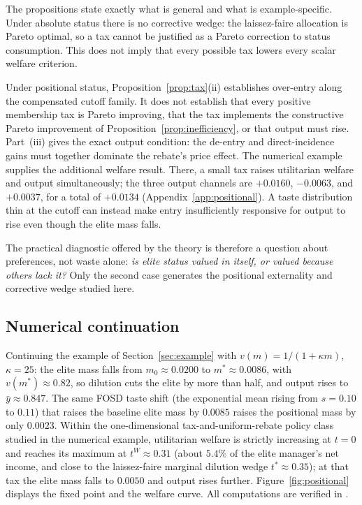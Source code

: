 \documentclass[12pt,letterpaper]{article}
\theoremstyle{definition}
\begin{document}
The propositions state exactly what is general and what is example-specific.
Under absolute status there is no corrective wedge: the laissez-faire allocation is Pareto optimal, so a tax cannot be justified as a Pareto correction to status consumption.
This does not imply that every possible tax lowers every scalar welfare criterion.

Under positional status, Proposition~\ref{prop:tax}(ii) establishes over-entry along the compensated cutoff family.
It does not establish that every positive membership tax is Pareto improving, that the tax implements the constructive Pareto improvement of Proposition~\ref{prop:inefficiency}, or that output must rise.
Part~(iii) gives the exact output condition: the de-entry and direct-incidence gains must together dominate the rebate's price effect.
The numerical example supplies the additional welfare result.
There, a small tax raises utilitarian welfare and output simultaneously; the three output channels are $+0.0160$, $-0.0063$, and $+0.0037$, for a total of $+0.0134$ (Appendix~\ref{app:positional}).
A taste distribution thin at the cutoff can instead make entry insufficiently responsive for output to rise even though the elite mass falls.

The practical diagnostic offered by the theory is therefore a question about preferences, not waste alone: \emph{is elite status valued in itself, or valued because others lack it?}
Only the second case generates the positional externality and corrective wedge studied here.

\subsection{Numerical continuation}

Continuing the example of Section~\ref{sec:example} with $v(m)=1/(1+\kappa m)$, $\kappa=25$: the elite mass falls from $m_0\approx 0.0200$ to $m^\ast\approx 0.0086$, with $v(m^\ast)\approx 0.82$, so dilution cuts the elite by more than half, and output rises to $\bar{y}\approx 0.847$.
The same FOSD taste shift (the exponential mean rising from $s=0.10$ to $0.11$) that raises the baseline elite mass by $0.0085$ raises the positional mass by only $0.0023$.
Within the one-dimensional tax-and-uniform-rebate policy class studied in the numerical example, utilitarian welfare is strictly increasing at $t=0$ and reaches its maximum at $t^{W}\approx 0.31$ (about $5.4\%$ of the elite manager's net income, and close to the laissez-faire marginal dilution wedge $t^\ast\approx 0.35$); at that tax the elite mass falls to $0.0050$ and output rises further.
Figure~\ref{fig:positional} displays the fixed point and the welfare curve.
All computations are verified in .
\end{document}
